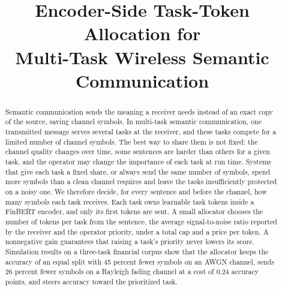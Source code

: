 \documentclass[conference]{IEEEtran}
\begin{document}
\title{Encoder-Side Task-Token Allocation for\\
       Multi-Task Wireless Semantic Communication}

\author{
\and
{}
}

\maketitle

\begin{abstract}
Semantic communication sends the meaning a receiver needs instead of
an exact copy of the source, saving channel symbols. In multi-task
semantic communication, one transmitted message serves several tasks
at the receiver, and these tasks compete for a limited number of
channel symbols. The best way to share them is not fixed: the channel
quality changes over time, some sentences are harder than others for a
given task, and the operator may change the importance of each task at
run time. Systems that give each task a fixed share, or always send the
same number of symbols, spend more symbols than a clean channel
requires and leave the tasks insufficiently protected on a noisy
one. We therefore decide, for every sentence and
before the channel, how many symbols each task receives. Each task
owns learnable task tokens inside a FinBERT encoder, and only its
first tokens are sent. A small allocator chooses the number of tokens
per task from the sentence, the average signal-to-noise ratio reported
by the receiver and the operator priority, under a total cap and a
price per token. A nonnegative gain guarantees that raising a task's
priority never lowers its score. Simulation results on a three-task
financial corpus show that the allocator keeps the accuracy of an
equal split with 45 percent fewer symbols on an AWGN channel, sends 26
percent fewer symbols on a Rayleigh fading channel at a cost of 0.24
accuracy points, and steers accuracy toward the prioritized task.
\end{abstract}
\end{document}
